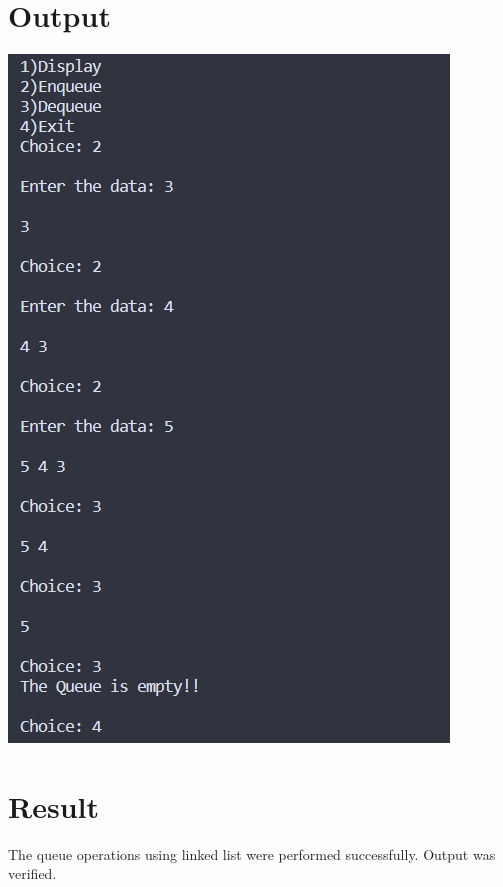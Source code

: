 \section{Output}
\includegraphics[]{Cycle_2/Outputs/Queue.png}

\section{Result}
The queue operations using linked list were performed successfully. Output was verified.
